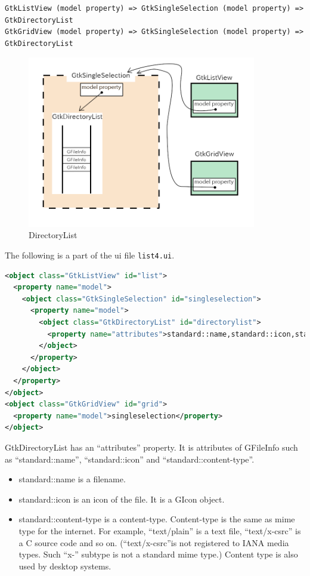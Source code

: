 \begin{lstlisting}
GtkListView (model property) => GtkSingleSelection (model property) => GtkDirectoryList
GtkGridView (model property) => GtkSingleSelection (model property) => GtkDirectoryList
\end{lstlisting}

\begin{figure}
\centering
\includegraphics[width=10cm,height=7.5cm]{../image/directorylist.png}
\caption{DirectoryList}
\end{figure}

The following is a part of the ui file
\passthrough{\lstinline!list4.ui!}.

\begin{lstlisting}[language=XML]
<object class="GtkListView" id="list">
  <property name="model">
    <object class="GtkSingleSelection" id="singleselection">
      <property name="model">
        <object class="GtkDirectoryList" id="directorylist">
          <property name="attributes">standard::name,standard::icon,standard::content-type</property>
        </object>
      </property>
    </object>
  </property>
</object>
<object class="GtkGridView" id="grid">
  <property name="model">singleselection</property>
</object>
\end{lstlisting}

GtkDirectoryList has an ``attributes'' property. It is attributes of
GFileInfo such as ``standard::name'', ``standard::icon'' and
``standard::content-type''.

\begin{itemize}
\tightlist
\item
  standard::name is a filename.
\item
  standard::icon is an icon of the file. It is a GIcon object.
\item
  standard::content-type is a content-type. Content-type is the same as
  mime type for the internet. For example, ``text/plain'' is a text
  file, ``text/x-csrc'' is a C source code and so on. (``text/x-csrc''is
  not registered to IANA media types. Such ``x-'' subtype is not a
  standard mime type.) Content type is also used by desktop systems.
\end{itemize}

